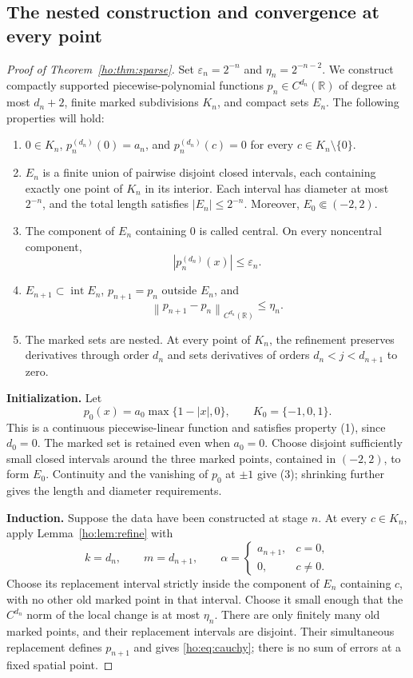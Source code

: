 \documentclass[11pt,reqno]{amsart}
\numberwithin{equation}{section}
\theoremstyle{definition}
\theoremstyle{remark}
\newcommand{\R}{\mathbb R}
\newcommand{\norm}[1]{\left\lVert #1\right\rVert}
\newcommand{\inter}{\operatorname{int}}
\begin{document}
\subsection{The nested construction and convergence at every point}
\begin{proof}[Proof of Theorem~\ref{ho:thm:sparse}]
Set $\varepsilon_n=2^{-n}$ and $\eta_n=2^{-n-2}$. We construct compactly supported piecewise-polynomial functions $p_n\in C^{d_n}(\R)$ of degree at most $d_n+2$, finite marked subdivisions $K_n$, and compact sets $E_n$. The following properties will hold:
\begin{enumerate}[label=\textup{(\arabic*)},leftmargin=2.4em]
\item $0\in K_n$, $p_n^{(d_n)}(0)=a_n$, and $p_n^{(d_n)}(c)=0$ for every $c\in K_n\setminus\{0\}$.
\item $E_n$ is a finite union of pairwise disjoint closed intervals, each containing exactly one point of $K_n$ in its interior. Each interval has diameter at most $2^{-n}$, and the total length satisfies $|E_n|\le2^{-n}$. Moreover, $E_0\Subset(-2,2)$.
\item The component of $E_n$ containing $0$ is called central. On every noncentral component,
\begin{equation}\label{ho:eq:noncentral}
 |p_n^{(d_n)}(x)|\le\varepsilon_n.
\end{equation}
\item $E_{n+1}\subset\inter E_n$, $p_{n+1}=p_n$ outside $E_n$, and
\begin{equation}\label{ho:eq:cauchy}
 \norm{p_{n+1}-p_n}_{C^{d_n}(\R)}\le\eta_n.
\end{equation}
\item The marked sets are nested. At every point of $K_n$, the refinement preserves derivatives through order $d_n$ and sets derivatives of orders $d_n<j<d_{n+1}$ to zero.
\end{enumerate}

\smallskip\noindent\textbf{Initialization.}
Let
\[
 p_0(x)=a_0\max\{1-|x|,0\},\qquad K_0=\{-1,0,1\}.
\]
This is a continuous piecewise-linear function and satisfies property (1), since $d_0=0$. The marked set is retained even when $a_0=0$. Choose disjoint sufficiently small closed intervals around the three marked points, contained in $(-2,2)$, to form $E_0$. Continuity and the vanishing of $p_0$ at $\pm1$ give (3); shrinking further gives the length and diameter requirements.

\smallskip\noindent\textbf{Induction.}
Suppose the data have been constructed at stage $n$. At every $c\in K_n$, apply Lemma~\ref{ho:lem:refine} with
\[
 k=d_n,\qquad m=d_{n+1},\qquad
 \alpha=\begin{cases}a_{n+1},&c=0,\\0,&c\ne0.\end{cases}
\]
Choose its replacement interval strictly inside the component of $E_n$ containing $c$, with no other old marked point in that interval. Choose it small enough that the $C^{d_n}$ norm of the local change is at most $\eta_n$. There are only finitely many old marked points, and their replacement intervals are disjoint. Their simultaneous replacement defines $p_{n+1}$ and gives \eqref{ho:eq:cauchy}; there is no sum of errors at a fixed spatial point.


\end{proof}
\end{document}
